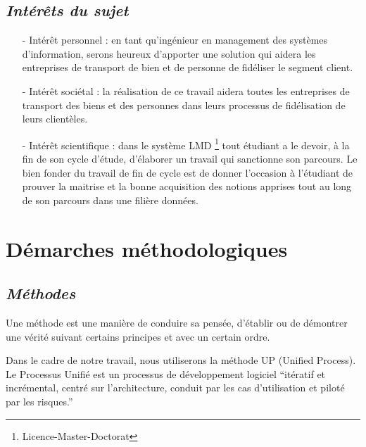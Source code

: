 \documentclass[a4paper,12pt,oneside]{book}
\begin{document}
            \subsection[Interet du sujet]{\textit{Intérêts du sujet}}
                \begin{itemize}
                    \item [-] Intérêt personnel : en tant qu’ingénieur en management 
                    des systèmes d’information, serons heureux d’apporter une solution
                    qui aidera les entreprises de transport de bien et de personne de fidéliser
                    le segment client.
                    \newline

                    \item [-] Intérêt sociétal : la réalisation de ce travail aidera toutes les
                    entreprises de transport des biens et des personnes dans leurs processus de
                    fidélisation de leurs clientèles.
                    \newline

                    \item [-] Intérêt scientifique : dans le système LMD \footnote[1]{Licence-Master-Doctorat} tout étudiant
                    a le devoir, à la fin de son cycle d’étude, d’élaborer un travail qui
                    sanctionne son parcours. Le bien fonder du travail de fin de cycle
                    est de donner l’occasion à l’étudiant de prouver la maitrise et la bonne acquisition
                    des notions apprises tout au long de son parcours dans une filière données.
                \end{itemize}
        \section[Démarches méthodologiques]{Démarches méthodologiques}
            \subsection[Méthodes]{\textit{Méthodes}}
            Une méthode est une manière de conduire sa pensée, d’établir ou de démontrer une
            vérité suivant certains principes et avec un certain ordre.
            \newline

            Dans le cadre de notre travail, nous utiliserons la méthode UP (Unified Process).
            Le Processus Unifié est un processus de développement logiciel \enquote{itératif et incrémental,
            centré sur l’architecture, conduit par les cas d’utilisation et piloté par les risques.}\cite{Roques2008}
            \newline
\end{document}
